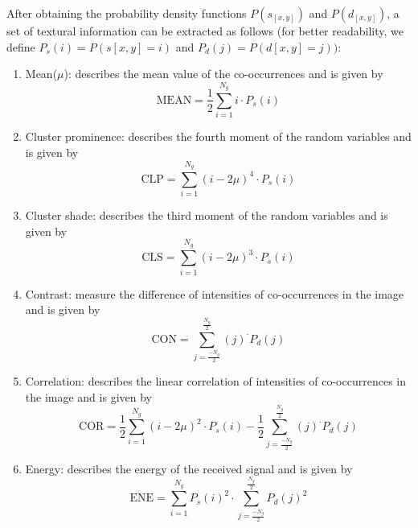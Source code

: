 After obtaining the probability density functions $P(s_{[x,y]})$ and $P(d_{[x,y]})$, a set of textural information can be extracted as follows (for better readability, we define $P_s(i) = P(s[x,y] = i)$ and $P_d(j) = P(d[x,y] = j))$:
\begin{enumerate}
    \item Mean($\mu$): describes the mean value of the co-occurrences and is given by
    \begin{equation}
        \textrm{MEAN} = \frac{1}{2}\sum_{i=1}^{N_g}i\cdot P_s(i)
    \end{equation}
    
    \item Cluster prominence: describes the fourth moment of the random variables and is given by
    \begin{equation}
        \textrm{CLP} = \sum_{i=1}^{N_g}(i-2\mu)^4\cdot P_s(i)
    \end{equation}
    
    \item Cluster shade: describes the third moment of the random variables and is given by
    \begin{equation}
        \textrm{CLS} = \sum_{i=1}^{N_g}(i-2\mu)^3\cdot P_s(i)
    \end{equation}
    
    \item Contrast: measure the difference of intensities of co-occurrences in the image and is given by
    \begin{equation}
        \textrm{CON} = \sum_{j=\frac{-N_g}{2}}^{\frac{N_g}{2}}(j)^\cdot P_d(j)
    \end{equation}
    
    \item Correlation: describes the linear correlation of intensities of co-occurrences in the image and is given by
    \begin{equation}
        \textrm{COR} = \frac{1}{2}\sum_{i=1}^{N_g}(i-2\mu)^2\cdot P_s(i)-\frac{1}{2}\sum_{j=\frac{-N_g}{2}}^{\frac{N_g}{2}}(j)^\cdot P_d(j)
    \end{equation}
    
    \item Energy: describes the energy of the received signal and is given by
    \begin{equation}
        \textrm{ENE} = \sum_{i=1}^{N_g}P_s(i)^2\cdot \sum_{j=\frac{-N_g}{2}}^{\frac{N_g}{2}} P_d(j)^2
    \end{equation}
    

\end{enumerate}
